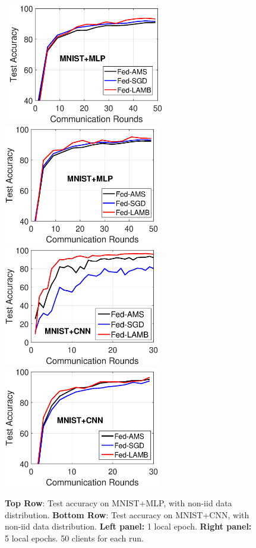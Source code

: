 \documentclass[11pt]{article}
\begin{document}
\vspace{-0.1in}
\begin{figure}[t]
    \begin{center}
        \mbox{
        \includegraphics[width=2.7in]{figure/mnist_testerror_mlp_ep1_client50_iid0.eps}
        \includegraphics[width=2.7in]{figure/mnist_testerror_mlp_ep5_client50_iid0.eps}
        }
        \mbox{
        \includegraphics[width=2.7in]{figure/mnist_testerror_cnn_ep1_client60_iid0.eps}
        \includegraphics[width=2.7in]{figure/mnist_testerror_cnn_ep5_client50_iid0.eps}
        }
    \end{center}
	\caption{\textbf{Top Row}: Test accuracy on MNIST+MLP, with non-iid data distribution. \textbf{Bottom Row}: Test accuracy on MNIST+CNN, with non-iid data distribution. \textbf{Left panel:} 1 local epoch. \textbf{Right panel:} 5 local epochs. 50 clients for each run.}
	\label{fig:mnist-mlp-noniid}
\end{figure}
\end{document}
